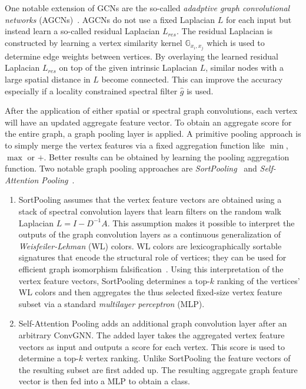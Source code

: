 \documentclass[12pt]{scrartcl}
\begin{document}
\begin{enumerate}[label=\textbf{\arabic*.}]
\begin{enumerate}[label=\textbf{\alph*)}]
				One notable extension of GCNs are the so-called \textit{adadptive graph convolutional networks} (AGCNs)~\cite{Li2018}.
				AGCNs do not use a fixed Laplacian $L$ for each input but instead learn a so-called residual Laplacian $L_\mathit{res}$.
				The residual Laplacian is constructed by learning a vertex similarity kernel $\mathbb{G}_{x_i,x_j}$ which is used to determine edge weights between vertices.
				By overlaying the learned residual Laplacian $L_\mathit{res}$ on top of the given intrinsic Laplacian $L$, similar nodes with a large spatial distance in $L$ become connected.
				This can improve the accuracy especially if a locality constrained spectral filter $\hat{g}$ is used.
		\end{enumerate}
		After the application of either spatial or spectral graph convolutions, each vertex will have an updated aggregate feature vector.
		To obtain an aggregate score for the entire graph, a graph pooling layer is applied.
		A primitive pooling approach is to simply merge the vertex features via a fixed aggregation function like $\min$, $\max$ or $+$.
		Better results can be obtained by learning the pooling aggregation function.
		Two notable graph pooling approaches are \textit{SortPooling}~\cite{Zhang2018} and \textit{Self-Attention Pooling}~\cite{Lee2019}.
		\begin{enumerate}
			\item SortPooling assumes that the vertex feature vectors are obtained using a stack of spectral convolution layers that learn filters on the random walk Laplacian $L = I - D^{-1} A$.
				This assumption makes it possible to interpret the outputs of the graph convolution layers as a continuous generalization of \textit{Weisfeiler-Lehman} (WL) colors.
				WL colors are lexicographically sortable signatures that encode the structural role of vertices; they can be used for efficient graph isomorphism falsification~\cite{Weisfeiler1968}.
				Using this interpretation of the vertex feature vectors, SortPooling determines a top-$k$ ranking of the vertices' WL colors and then aggregates the thus selected fixed-size vertex feature subset via a standard \textit{multilayer perceptron} (MLP).
			\item Self-Attention Pooling adds an additional graph convolution layer after an arbitrary ConvGNN.\@
				The added layer takes the aggregated vertex feature vectors as input and outputs a score for each vertex.
				This score is used to determine a top-$k$ vertex ranking.
				Unlike SortPooling the feature vectors of the resulting subset are first added up.
				The resulting aggregate graph feature vector is then fed into a MLP to obtain a class.
		\end{enumerate}
\end{enumerate}
\end{document}
